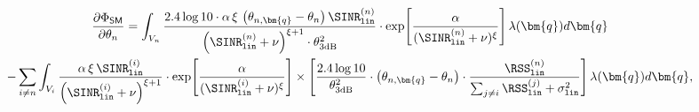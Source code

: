 \begin{figure*}[t!]
    \begin{multline}\label{gradient-vector-theta-SM-equation}
    \frac{\partial \Phi_{{\sf SM}}}{\partial \theta_n} =   \int_{V_n }  \frac{2.4 \log 10 \cdot \alpha \, \xi \,\left(\theta_{n,\bm{q}} - \theta_n \right) \SINR^{(n)}_{\mathtt{lin}} }{\left(\SINR^{(n)}_{\mathtt{lin}} + \nu\right)^{\xi+1} \cdot \theta^2_{\text{3dB}}} 
    \cdot \exp \! \left[ \frac{\alpha}{(\SINR^{(n)}_{\mathtt{lin}} + \nu )^{\xi}}\right]   \lambda(\bm{q})d\bm{q}   \\
    - \sum_{i\neq n}   \int_{V_i }  \frac{\alpha \, \xi \, \SINR^{(i)}_{\mathtt{lin}}}{\left(\SINR^{(i)}_{\mathtt{lin}} + \nu\right)^{\xi+1}} 
    \cdot \exp \! \left[ \frac{\alpha}{(\SINR^{(i)}_{\mathtt{lin}} + \nu )^{\xi}}\right] \times  
    \left[ \frac{2.4 \log 10}{\theta^2_{\text{3dB}}} \cdot \left(\theta_{n,\bm{q}} - \theta_n \right) \cdot {\frac{\RSS^{(n)}_{\mathtt{lin}}}{\sum_{j\neq i}^{} \RSS^{(j)}_{\mathtt{lin}} + \sigma^2_{\mathtt{lin}}}} \right]   \lambda(\bm{q})d\bm{q}   ,    
\end{multline}
\end{figure*}







